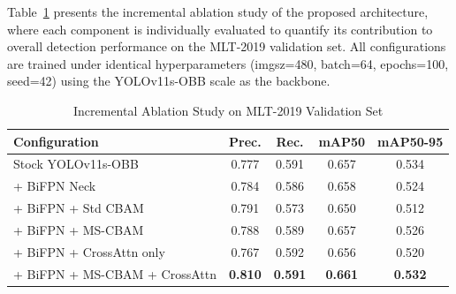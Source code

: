 \documentclass{ieeeaccess}
\begin{document}
Table~\ref{tab:ablation} presents the incremental ablation study of the proposed architecture, where each component is individually evaluated to quantify its contribution to overall detection performance on the MLT-2019 validation set. All configurations are trained under identical hyperparameters (imgsz=480, batch=64, epochs=100, seed=42) using the YOLOv11s-OBB scale as the backbone.

\begin{table}[htbp]
\caption{Incremental Ablation Study on MLT-2019 Validation Set}
\label{tab:ablation}
\renewcommand{\arraystretch}{1.1}
\begin{center}
\scriptsize
\begin{tabular}{|>{\raggedright\arraybackslash}p{3.2cm}|c|c|c|c|}
\hline
\textbf{Configuration} & \textbf{Prec.} & \textbf{Rec.} & \textbf{mAP50} & \textbf{mAP50-95} \\
\hline
Stock YOLOv11s-OBB             & 0.777 & 0.591 & 0.657 & 0.534 \\
+ BiFPN Neck                   & 0.784 & 0.586 & 0.658 & 0.524 \\
+ BiFPN + Std CBAM             & 0.791 & 0.573 & 0.650 & 0.512 \\
+ BiFPN + MS-CBAM              & 0.788 & 0.589 & 0.657 & 0.526 \\
+ BiFPN + CrossAttn only       & 0.767 & 0.592 & 0.656 & 0.520 \\
+ BiFPN + MS-CBAM + CrossAttn  & \textbf{0.810} & \textbf{0.591} & \textbf{0.661} & \textbf{0.532} \\
\hline
\end{tabular}
\end{center}
\end{table}
\end{document}
